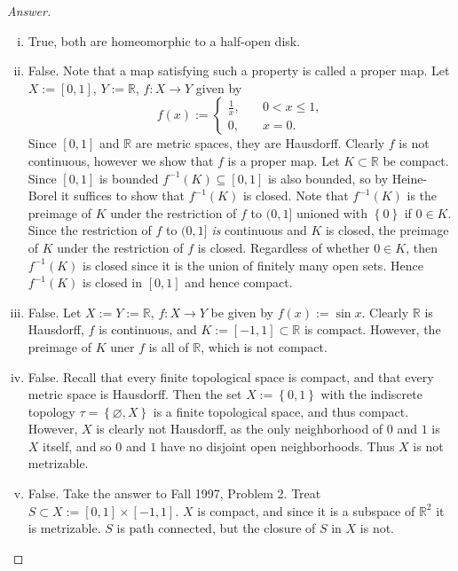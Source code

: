 \documentclass[12pt]{article}
\newcommand{\real}{\mathbb{R}}
\newcommand{\ita}[1]{\textit{#1}}
\newcommand\inv[1]{#1^{-1}}
\newcommand\setb[1]{\left \{ #1 \right \}}
\theoremstyle{definition}
\begin{document}
\begin{proof}[Answer]
    \noindent
    \begin{enumerate}[(i)]
        \item True, both are homeomorphic to a half-open disk.
        \item False. Note that a map satisfying such a property is called a proper map. Let $X := [0,1]$, $Y := \real$, $f : X \to Y$ given by 
        \[
            f(x) := 
            \begin{cases}
                \frac{1}{x} , & \quad 0 < x \leq 1, \\
                0 , & \quad x = 0.
            \end{cases}
        \]
        Since $[0,1]$ and $\real$ are metric spaces, they are Hausdorff. Clearly $f$ is not continuous, however we show that $f$ is a proper map. Let $K \subset \real$ be compact. Since $[0,1]$ is bounded $\inv{f}(K) \subseteq [0,1]$ is also bounded, so by Heine-Borel it suffices to show that $\inv{f}(K)$ is closed. Note that $\inv{f}(K)$ is the preimage of $K$ under the restriction of $f$ to $(0,1]$ unioned with $\setb{ 0 }$ if $0 \in K$. Since the restriction of $f$ to $(0,1]$ \ita{is} continuous and $K$ is closed, the preimage of $K$ under the restriction of $f$ is closed. Regardless of whether $0 \in K$, then $\inv{f}(K)$ is closed since it is the union of finitely many open sets. Hence $\inv{f}(K)$ is closed in $[0,1]$ and hence compact. 
        \item False. Let $X := Y := \real$, $f : X \to Y$ be given by $f(x) := \sin x$. Clearly $\real$ is Hausdorff, $f$ is continuous, and $K := [-1,1] \subset \real$ is compact. However, the preimage of $K$ uner $f$ is all of $\real$, which is not compact.
        \item False. Recall that every finite topological space is compact, and that every metric space is Hausdorff. Then the set $X := \setb{0,1}$ with the indiscrete topology $\tau = \setb{ \varnothing , X }$ is a finite topological space, and thus compact. However, $X$ is clearly not Hausdorff, as the only neighborhood of $0$ and $1$ is $X$ itself, and so $0$ and $1$ have no disjoint open neighborhoods. Thus $X$ is not metrizable.
        \item False. Take the answer to Fall 1997, Problem 2. Treat $S \subset X := [0,1] \times [-1,1]$. $X$ is compact, and since it is a subspace of $\real^2$ it is metrizable. $S$ is path connected, but the closure of $S$ in $X$ is not.
    \end{enumerate}
\end{proof}
\end{document}
